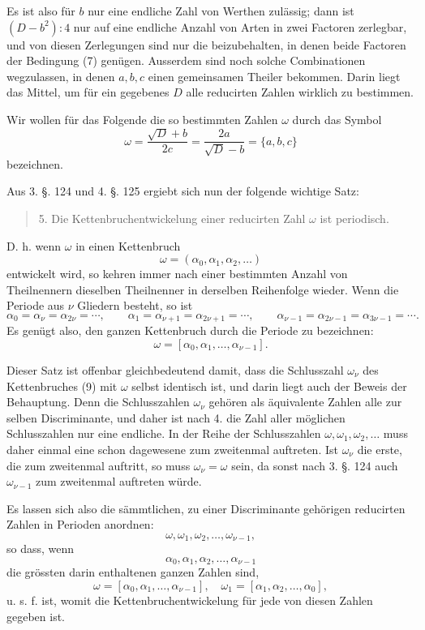 \documentclass[11pt]{article}
\begin{document}
Es ist also für $b$ nur eine endliche Zahl von Werthen zulässig; dann ist $(D-b^2):4$ nur auf eine endliche Anzahl von Arten in zwei Factoren zerlegbar, und von diesen Zerlegungen sind nur die beizubehalten, in denen beide Factoren der Bedingung (7) genügen. Ausserdem sind noch solche Combinationen wegzulassen, in denen $a,b,c$ einen gemeinsamen Theiler bekommen. Darin liegt das Mittel, um für ein gegebenes $D$ alle reducirten Zahlen wirklich zu bestimmen.

Wir wollen für das Folgende die so bestimmten Zahlen $\omega$ durch das Symbol
\[
\tag{8}        \omega=\frac{\sqrt D+b}{2c}
=\frac{2a}{\sqrt D-b}=\{a,b,c\}
\]
bezeichnen.

Aus 3. §. 124 und 4. §. 125 ergiebt sich nun der folgende wichtige Satz:
\begin{quote}
5. Die Kettenbruchentwickelung einer reducirten Zahl $\omega$ ist periodisch.
\end{quote}
D. h. wenn $\omega$ in einen Kettenbruch
\[
\tag{9}        \omega=(\alpha_0,\alpha_1,\alpha_2,\ldots)
\]
entwickelt wird, so kehren immer nach einer bestimmten Anzahl von Theilnennern dieselben Theilnenner in derselben Reihenfolge wieder. Wenn die Periode aus $\nu$ Gliedern besteht, so ist
\[
\alpha_0=\alpha_\nu=\alpha_{2\nu}=\cdots,\qquad
\alpha_1=\alpha_{\nu+1}=\alpha_{2\nu+1}=\cdots,\qquad
\alpha_{\nu-1}=\alpha_{2\nu-1}=\alpha_{3\nu-1}=\cdots.
\]
Es genügt also, den ganzen Kettenbruch durch die Periode zu bezeichnen:
\[
\tag{10}       \omega=[\alpha_0,\alpha_1,\ldots,\alpha_{\nu-1}].
\]

Dieser Satz ist offenbar gleichbedeutend damit, dass die Schlusszahl $\omega_\nu$ des Kettenbruches (9) mit $\omega$ selbst identisch ist, und darin liegt auch der Beweis der Behauptung. Denn die Schlusszahlen $\omega_\nu$ gehören als äquivalente Zahlen alle zur selben Discriminante, und daher ist nach 4. die Zahl aller möglichen Schlusszahlen nur eine endliche. In der Reihe der Schlusszahlen $\omega,\omega_1,\omega_2,\ldots$ muss daher einmal eine schon dagewesene zum zweitenmal auftreten. Ist $\omega_\nu$ die erste, die zum zweitenmal auftritt, so muss $\omega_\nu=\omega$ sein, da sonst nach 3. §. 124 auch $\omega_{\nu-1}$ zum zweitenmal auftreten würde.

Es lassen sich also die sämmtlichen, zu einer Discriminante gehörigen reducirten Zahlen in Perioden anordnen:
\[
\tag{11}       \omega,\omega_1,\omega_2,\ldots,\omega_{\nu-1},
\]
so dass, wenn
\[
        \alpha_0,\alpha_1,\alpha_2,\ldots,\alpha_{\nu-1}
\]
die grössten darin enthaltenen ganzen Zahlen sind,
\[
        \omega=[\alpha_0,\alpha_1,\ldots,\alpha_{\nu-1}],\quad
        \omega_1=[\alpha_1,\alpha_2,\ldots,\alpha_0],
\]
u. s. f. ist, womit die Kettenbruchentwickelung für jede von diesen Zahlen gegeben ist.
\end{document}
